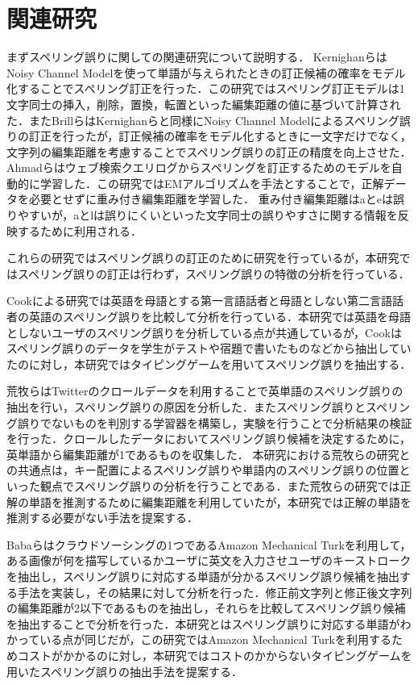 \chapter{関連研究}
まずスペリング誤りに関しての関連研究について説明する．
KernighanらはNoisy Channel Modelを使って単語が与えられたときの訂正候補の確率をモデル化することでスペリング訂正を行った\cite{kernighan1990spelling}．この研究ではスペリング訂正モデルは1文字同士の挿入，削除，置換，転置といった編集距離の値に基づいて計算された．またBrillらはKernighanらと同様にNoisy Channel Modelによるスペリング誤りの訂正を行ったが，訂正候補の確率をモデル化するときに一文字だけでなく，文字列の編集距離を考慮することでスペリング誤りの訂正の精度を向上させた\cite{brill2000improved}．
Ahmadらはウェブ検索クエリログからスペリングを訂正するためのモデルを自動的に学習した\cite{ahmad2005learning}．この研究ではEMアルゴリズムを手法とすることで，正解データを必要とせずに重み付き編集距離を学習した．
重み付き編集距離はaとeは誤りやすいが，aとlは誤りにくいといった文字同士の誤りやすさに関する情報を反映するために利用される．
\begin{comment}
Ahmadらはまず重み付けされていないモデルを用いて誤りを検出し，その誤りを用いてモデルの重み付けを更新することで学習を行った．
\end{comment}
これらの研究ではスペリング誤りの訂正のために研究を行っているが，本研究ではスペリング誤りの訂正は行わず，スペリング誤りの特徴の分析を行っている．

Cookによる研究\cite{cook1997l2}では英語を母語とする第一言語話者と母語としない第二言語話者の英語のスペリング誤りを比較して分析を行っている．本研究では英語を母語としないユーザのスペリング誤りを分析している点が共通しているが，Cookはスペリング誤りのデータを学生がテストや宿題で書いたものなどから抽出していたのに対し，本研究ではタイピングゲームを用いてスペリング誤りを抽出する．

荒牧らはTwitterのクロールデータを利用することで英単語のスペリング誤りの抽出を行い，スペリング誤りの原因を分析した\cite{aramakiNLP2010}．またスペリング誤りとスペリング誤りでないものを判別する学習器を構築し，実験を行うことで分析結果の検証を行った．クロールしたデータにおいてスペリング誤り候補を決定するために，英単語から編集距離が1であるものを収集した．
本研究における荒牧らの研究との共通点は，キー配置によるスペリング誤りや単語内のスペリング誤りの位置といった観点でスペリング誤りの分析を行うことである．また荒牧らの研究では正解の単語を推測するために編集距離を利用していたが，本研究では正解の単語を推測する必要がない手法を提案する．

Babaらはクラウドソーシングの1つであるAmazon Mechanical Turkを利用して，ある画像が何を描写しているかユーザに英文を入力させユーザのキーストロークを抽出し，スペリング誤りに対応する単語が分かるスペリング誤り候補を抽出する手法を実装し，その結果に対して分析を行った\cite{babaACL2012}．修正前文字列と修正後文字列の編集距離が2以下であるものを抽出し，それらを比較してスペリング誤り候補を抽出することで分析を行った．本研究とはスペリング誤りに対応する単語がわかっている点が同じだが，この研究ではAmazon Mechanical Turkを利用するためコストがかかるのに対し，本研究ではコストのかからないタイピングゲームを用いたスペリング誤りの抽出手法を提案する．

